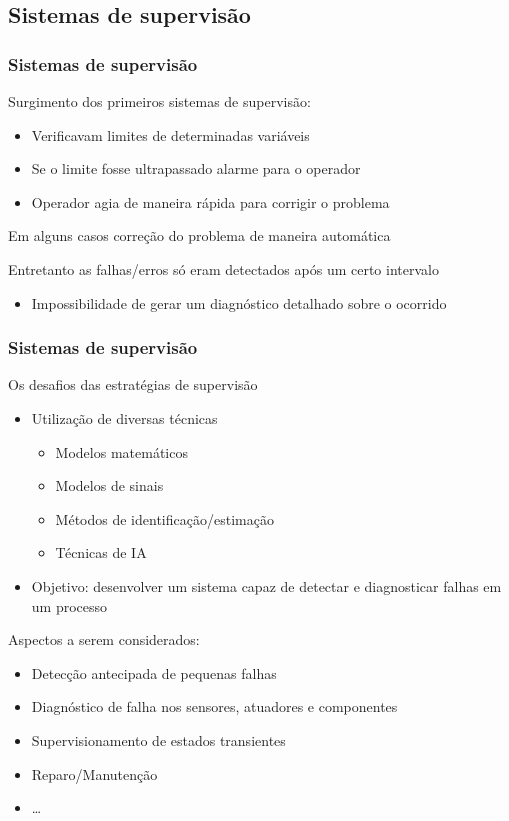 \documentclass{beamer}
\begin{document}
\subsection{Sistemas de supervisão}
\begin{frame}
    \frametitle{Sistemas de supervisão}

    Surgimento dos primeiros sistemas de supervisão:

\begin{itemize}
    \item Verificavam limites de determinadas variáveis
    \item Se o limite fosse ultrapassado \implica alarme para o operador
    \item Operador agia de maneira rápida para corrigir o problema
\end{itemize}

    Em alguns casos \implica correção do problema de maneira automática

    \vspace{0.25cm}

    Entretanto as falhas/erros só eram detectados após um certo intervalo

\begin{itemize}
    \item Impossibilidade de gerar um diagnóstico detalhado sobre o ocorrido
\end{itemize}

\end{frame}

\begin{frame}
    \frametitle{Sistemas de supervisão}

    Os desafios das estratégias de supervisão

\begin{itemize}
    \item Utilização de diversas técnicas
    \begin{itemize}
        \item Modelos matemáticos
        \item Modelos de sinais
        \item Métodos de identificação/estimação
        \item \alert{Técnicas de IA}
    \end{itemize}
    \item Objetivo: desenvolver um sistema capaz de detectar e diagnosticar
          falhas em um processo
\end{itemize}

Aspectos a serem considerados:

\begin{itemize}
    \item Detecção antecipada de pequenas falhas
    \item Diagnóstico de falha nos sensores, atuadores e componentes
    \item Supervisionamento de estados transientes
    \item Reparo/Manutenção
    \item \ldots
\end{itemize}
\end{frame}
\end{document}
